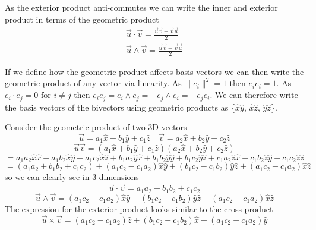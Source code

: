 \documentclass[options]{report}
\def \u{\vec{u}}
\def \v{\vec{v}}
\def \xhat{\hat{x}}
\def \yhat{\hat{y}}
\def \zhat{\hat{z}}
\newcommand{\norm}[1]{\lVert #1 \rVert}
\begin{document}
As the exterior product anti-commutes we can write the inner and exterior product in terms of the geometric product
\begin{equation}
	\begin{gathered}
		\u \cdot \v = \frac{\u\v + \v\u}{2} \\
		\u \wedge \v = \frac{\u\v - \v\u}{2}
	\end{gathered}
\end{equation}

If we define how the geometric product affects basis vectors we can then write the geometric product of any vector via linearity. As $\norm{e_i}^2 = 1$ then $e_i e_i = 1$. As $e_i \cdot e_j = 0$ for $i \ne j$ then $e_i e_j = e_i \wedge e_j = -e_j \wedge e_i = - e_j e_i$. We can therefore write the basis vectors of the bivectors using geometric products as \{$\xhat\yhat$, $\xhat\zhat$, $\yhat\zhat$\}.

Consider the geometric product of two 3D vectors
\begin{equation*}
	\u = a_1 \xhat + b_1 \yhat + c_1 \zhat \quad \v = a_2 \xhat + b_2 \yhat + c_2 \zhat
\end{equation*}
\begin{equation*}
	\u \v = \left( a_1 \xhat + b_1 \yhat + c_1 \zhat \right) \left( a_2 \xhat + b_2 \yhat + c_2 \zhat \right)
\end{equation*}
\begin{equation*}
	= a_1 a_2 \xhat \xhat + a_1 b_2 \xhat \yhat + a_1 c_2 \xhat \zhat + b_1 a_2 \yhat \xhat + b_1 b_2 \yhat \yhat + b_1 c_2 \yhat \zhat + c_1 a_2 \zhat \xhat + c_1 b_2 \zhat \yhat + c_1 c_2 \zhat \zhat
\end{equation*}
\begin{equation*}
	= \left( a_1 a_2 + b_1 b_2 + c_1 c_2 \right) + \left( a_1 c_2 - c_1 a_2 \right) \xhat \yhat + \left( b_1 c_2 - c_1 b_2 \right) \yhat \zhat + \left( a_1 c_2 - c_1 a_2 \right) \xhat \zhat
\end{equation*}
so we can clearly see in 3 dimensions
\begin{equation*}
	\u \cdot \v = a_1 a_2 + b_1 b_2 + c_1 c_2
\end{equation*}
\begin{equation*}
	\u \wedge \v = \left( a_1 c_2 - c_1 a_2 \right) \xhat \yhat + \left( b_1 c_2 - c_1 b_2 \right) \yhat \zhat + \left( a_1 c_2 - c_1 a_2 \right) \xhat \zhat
\end{equation*}
The expression for the exterior product looks similar to the cross product
\begin{equation}
	\u \times \v = \left( a_1 c_2 - c_1 a_2 \right) \zhat + \left( b_1 c_2 - c_1 b_2 \right) \xhat - \left( a_1 c_2 - c_1 a_2 \right) \yhat
\end{equation}
\end{document}
